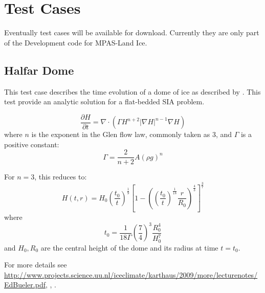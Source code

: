 \chapter{Test Cases}
\label{chap:landice_test_cases}

Eventually test cases will be available for download.  Currently they are only part of the Development code for MPAS-Land Ice.


\FloatBarrier


\section{Halfar Dome}
\label{sec:halfar_description}
This test case describes the time evolution of a dome of ice as described by \citet{Halfar1983}.
This test provide an analytic solution for a flat-bedded SIA problem.

\begin{equation}
    \label{halfar}
    \frac{\partial H}{\partial t} = \nabla \cdot (\Gamma H^{n+2} |\nabla H|^{n-1} \nabla H)
\end{equation}
where $n$ is the exponent in the Glen flow law, commonly taken as 3, and $\Gamma$ is a positive constant:
\begin{equation}
    \Gamma = \frac{2}{n+2} A (\rho g)^n
\end{equation}

For $n=3$, this reduces to:
\begin{equation}
    H(t,r) = H_0 \left(\frac{t_0}{t}\right)^\frac{1}{9}  \left[ 1 - \left(  \left( \frac{t_0}{t} \right) ^ \frac{1}{18} \frac{r}{R_0} \right)^\frac{4}{3} \right] ^ \frac{3}{7}
\end{equation}
where
\begin{equation}
    t_0 = \frac{1}{18\Gamma} \left( \frac{7}{4} \right)^3 \frac{R_0^4}{H_0^7}
\end{equation}
and $H_0, R_0$ are the central height of the dome and its radius at time $t=t_0$.

For more details see \url{http://www.projects.science.uu.nl/iceclimate/karthaus/2009/more/lecturenotes/EdBueler.pdf},  \citet{Bueler2005}, \citet{Halfar1983}.



